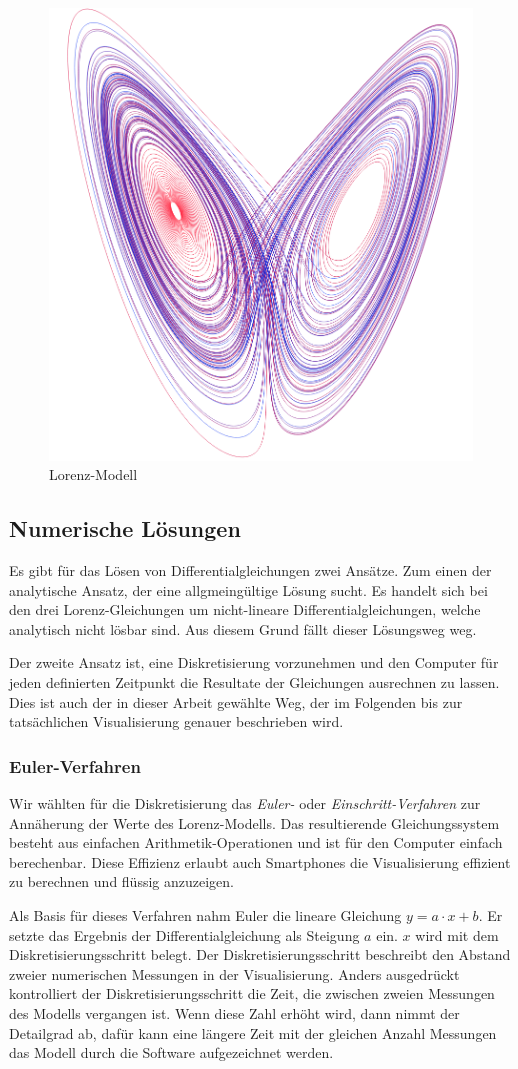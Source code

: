 \begin{figure}
	\centering
	\includegraphics[width=0.3\linewidth]{lorenz/assets/lorenz-modell/lorenz-modell}
	\caption{Lorenz-Modell}
	\label{fig:lorenz-modell}
\end{figure}


\subsection{Numerische Lösungen}
Es gibt für das Lösen von Differentialgleichungen zwei Ansätze. Zum einen der analytische Ansatz, der eine allgmeingültige Lösung sucht. Es handelt sich bei den drei Lorenz-Gleichungen um nicht-lineare Differentialgleichungen, welche analytisch nicht lösbar sind. Aus diesem Grund fällt dieser Lösungsweg weg. 

Der zweite Ansatz ist, eine Diskretisierung vorzunehmen und den Computer für jeden definierten Zeitpunkt die Resultate der Gleichungen ausrechnen zu lassen. Dies ist auch der in dieser Arbeit gewählte Weg, der im Folgenden bis zur tatsächlichen Visualisierung genauer beschrieben wird. 

\subsubsection{Euler-Verfahren}

Wir wählten für die Diskretisierung das \textit{Euler-} oder \textit{Einschritt-Verfahren} zur Annäherung der Werte des Lorenz-Modells. Das resultierende Gleichungssystem besteht aus einfachen Arithmetik-Operationen und ist für den Computer einfach berechenbar. Diese Effizienz erlaubt auch Smartphones die Visualisierung effizient zu berechnen und flüssig anzuzeigen.

Als Basis für dieses Verfahren nahm Euler die lineare Gleichung $ y = a \cdot x + b $. Er setzte das Ergebnis der Differentialgleichung als Steigung $ a $ ein. $x$ wird mit dem Diskretisierungsschritt belegt. Der Diskretisierungsschritt beschreibt den Abstand zweier numerischen Messungen in der Visualisierung. Anders ausgedrückt kontrolliert der Diskretisierungsschritt die Zeit, die zwischen zweien Messungen des Modells vergangen ist. Wenn diese Zahl erhöht wird, dann nimmt der Detailgrad ab, dafür kann eine längere Zeit mit der gleichen Anzahl Messungen das Modell durch die Software aufgezeichnet werden.

